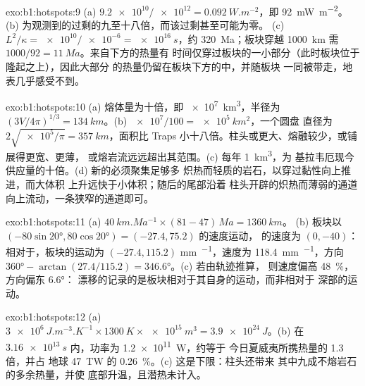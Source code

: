 \begin{solution}{exo:b1:hotspots:9}
(a) $\num{9.2e10}/\num{e12} = \qty{0.092}{W.m^{-2}}$，即 \qty{92}{mW.m^{-2}}。
(b) 为观测到的过剩的九至十八倍，而该过剩甚至可能为零。
(c) $L^2/\kappa =
\num{e10}/\num{e-6} = \qty{e16}{s}$，约 \qty{320}{Ma}；板块穿越
\qty{1000}{km} 需 $1000/92 = \qty{11}{Ma}$。来自下方的热量有
时间仅穿过板块的一小部分（此时板块位于隆起之上），因此大部分
的热量仍留在板块下方的中，并随板块
一同被带走，地表几乎感受不到。
\end{solution}

\begin{solution}{exo:b1:hotspots:10}
(a) 熔体量为十倍，即 \qty{e7}{km^3}，半径为
$(3V/4\pi)^{1/3} = \qty{134}{km}$。(b) $\num{e7}/100 = \qty{e5}{km^2}$，一个圆盘
直径为 $2\sqrt{\num{e5}/\pi} = \qty{357}{km}$，面积比
Traps 小十八倍。柱头或更大、熔融较少，或铺展得更宽、更薄，
或熔岩流远远超出其范围。(c) 每年 \qty{1}{km^3}，为
基拉韦厄现今供应量的十倍。(d) 新的必须聚集足够多
炽热而轻质的岩石，以穿过黏性向上推进，而大体积
上升远快于小体积；随后的尾部沿着
柱头开辟的炽热而薄弱的通道向上流动，一条狭窄的通道即可。
\end{solution}

\begin{solution}{exo:b1:hotspots:11}
(a) $\qty{40}{km.Ma^{-1}}\times(81 - 47)\,\unit{Ma} = \qty{1360}{km}$。
(b) 板块以 $(-80\sin\ang{20}, 80\cos\ang{20}) = (-27.4, 75.2)$ 的速度运动，
的速度为 $(0, -40)$：相对于，板块的运动为
$(-27.4, 115.2)$ \unit{mm.^{-1}}，速度为 \qty{118.4}{mm.^{-1}}，方向
$\ang{360} - \arctan(27.4/115.2) = \ang{346.6}$。(c) 若由轨迹推算，
则速度偏高 \qty{48}{\percent}，方向偏东 \ang{6.6}：
漂移的记录的是板块相对于其自身的运动，而非相对于
深部的运动。
\end{solution}

\begin{solution}{exo:b1:hotspots:12}
(a) $\qty{3e6}{J.m^{-3}.K^{-1}}\times\qty{1300}{K}\times\qty{e15}{m^3} =
\qty{3.9e24}{J}$。(b) 在 $\qty{3.16e13}{s}$ 内，功率为 \qty{1.2e11}{W}，约等于
今日夏威夷所携热量的 1.3 倍，并占
地球 \qty{47}{TW} 的 \qty{0.26}{\percent}。(c) 这是下限：柱头还带来
其中九成不熔岩石的多余热量，并使
底部升温，且潜热未计入。
\end{solution}

